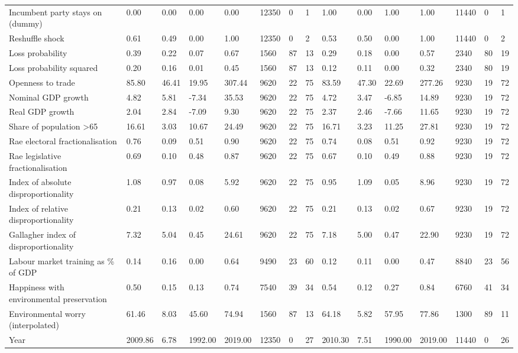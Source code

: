 \begin{longtable}{lllllllllllllll}
Incumbent party stays on (dummy) & 0.00 & 0.00 & 0.00 & 0.00 & 12350 & 0 & 1 & 1.00 & 0.00 & 1.00 & 1.00 & 11440 & 0 & 1\\
Reshuffle shock & 0.61 & 0.49 & 0.00 & 1.00 & 12350 & 0 & 2 & 0.53 & 0.50 & 0.00 & 1.00 & 11440 & 0 & 2\\
\addlinespace
Loss probability & 0.39 & 0.22 & 0.07 & 0.67 & 1560 & 87 & 13 & 0.29 & 0.18 & 0.00 & 0.57 & 2340 & 80 & 19\\
Loss probability squared & 0.20 & 0.16 & 0.01 & 0.45 & 1560 & 87 & 13 & 0.12 & 0.11 & 0.00 & 0.32 & 2340 & 80 & 19\\
Openness to trade & 85.80 & 46.41 & 19.95 & 307.44 & 9620 & 22 & 75 & 83.59 & 47.30 & 22.69 & 277.26 & 9230 & 19 & 72\\
Nominal GDP growth & 4.82 & 5.81 & -7.34 & 35.53 & 9620 & 22 & 75 & 4.72 & 3.47 & -6.85 & 14.89 & 9230 & 19 & 72\\
Real GDP growth & 2.04 & 2.84 & -7.09 & 9.30 & 9620 & 22 & 75 & 2.37 & 2.46 & -7.66 & 11.65 & 9230 & 19 & 72\\
\addlinespace
Share of population >65 & 16.61 & 3.03 & 10.67 & 24.49 & 9620 & 22 & 75 & 16.71 & 3.23 & 11.25 & 27.81 & 9230 & 19 & 72\\
Rae electoral fractionalisation & 0.76 & 0.09 & 0.51 & 0.90 & 9620 & 22 & 75 & 0.74 & 0.08 & 0.51 & 0.92 & 9230 & 19 & 72\\
Rae legislative fractionalisation & 0.69 & 0.10 & 0.48 & 0.87 & 9620 & 22 & 75 & 0.67 & 0.10 & 0.49 & 0.88 & 9230 & 19 & 72\\
Index of absolute disproportionality & 1.08 & 0.97 & 0.08 & 5.92 & 9620 & 22 & 75 & 0.95 & 1.09 & 0.05 & 8.96 & 9230 & 19 & 72\\
Index of relative disproportionality & 0.21 & 0.13 & 0.02 & 0.60 & 9620 & 22 & 75 & 0.21 & 0.13 & 0.02 & 0.67 & 9230 & 19 & 72\\
\addlinespace
Gallagher index of disproportionality & 7.32 & 5.04 & 0.45 & 24.61 & 9620 & 22 & 75 & 7.18 & 5.00 & 0.47 & 22.90 & 9230 & 19 & 72\\
Labour market training as \% of GDP & 0.14 & 0.16 & 0.00 & 0.64 & 9490 & 23 & 60 & 0.12 & 0.11 & 0.00 & 0.47 & 8840 & 23 & 56\\
Happiness with environmental preservation & 0.50 & 0.15 & 0.13 & 0.74 & 7540 & 39 & 34 & 0.54 & 0.12 & 0.27 & 0.84 & 6760 & 41 & 34\\
Environmental worry (interpolated) & 61.46 & 8.03 & 45.60 & 74.94 & 1560 & 87 & 13 & 64.18 & 5.82 & 57.95 & 77.86 & 1300 & 89 & 11\\
Year & 2009.86 & 6.78 & 1992.00 & 2019.00 & 12350 & 0 & 27 & 2010.30 & 7.51 & 1990.00 & 2019.00 & 11440 & 0 & 26\\
\bottomrule
\end{longtable}
